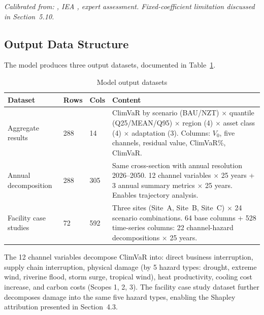 \small\textit{Calibrated from: \citet{barrot2016}, IEA \citep{iea2025energyai}, expert assessment.
Fixed-coefficient limitation discussed in Section~5.10.}
\normalsize



\subsection{Output Data Structure}
\label{app:outputs}

The model produces three output datasets, documented in Table~\ref{tab:app_outputs}.

\begin{table}[H]
\centering
\footnotesize
\caption{Model output datasets}
\label{tab:app_outputs}
\renewcommand{\arraystretch}{1.2}
\begin{tabular}{@{}p{2.8cm}p{1.3cm}p{1.3cm}p{8cm}@{}}
\toprule
\textbf{Dataset} & \textbf{Rows} & \textbf{Cols} & \textbf{Content} \\
\midrule
Aggregate results & 288 & 14 & ClimVaR by scenario (BAU/NZT) $\times$ quantile (Q25/MEAN/Q95) $\times$ region (4) $\times$ asset class (4) $\times$ adaptation (3). Columns: $V_0$, five channels, residual value, ClimVaR\%, ClimVaR. \\[0.2cm]
Annual decomposition & 288 & 305 & Same cross-section with annual resolution 2026--2050. 12 channel variables $\times$ 25 years + 3 annual summary metrics $\times$ 25 years. Enables trajectory analysis. \\[0.2cm]
Facility case studies & 72 & 592 & Three sites (Site~A, Site~B, Site~C) $\times$ 24 scenario combinations. 64 base columns + 528 time-series columns: 22 channel-hazard decompositions $\times$ 25 years. \\
\bottomrule
\end{tabular}
\end{table}

The 12 channel variables decompose ClimVaR into: direct business interruption, supply
chain interruption, physical damage (by 5 hazard types: drought, extreme wind, riverine
flood, storm surge, tropical wind), heat productivity, cooling cost increase, and carbon
costs (Scopes 1, 2, 3). The facility case study dataset further decomposes damage into the
same five hazard types, enabling the Shapley attribution presented in Section~4.3.




